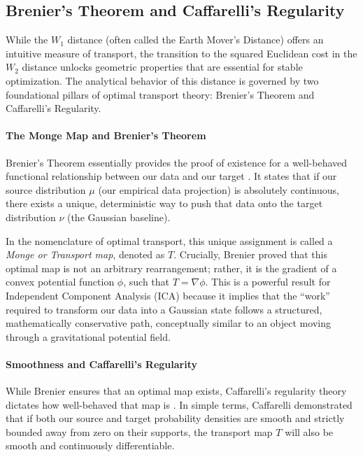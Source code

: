 \documentclass[12pt,a4paper,twoside,openany]{book}
\begin{document}
\subsection{Brenier's Theorem and Caffarelli's Regularity}
\label{sec:brenier_caffarelli}
While the $W_1$ distance (often called the Earth Mover's Distance) offers an intuitive measure of transport, the transition to the squared Euclidean cost in 
the $W_2$ distance unlocks geometric properties that are essential for stable optimization. The analytical behavior of this distance is governed by 
two foundational pillars of optimal transport theory: Brenier's Theorem and Caffarelli's Regularity.

\paragraph{The Monge Map and Brenier's Theorem}
Brenier's Theorem essentially provides the proof of existence for a well-behaved functional relationship between our data and our target \cite{brenier1991}. 
It states that if our source distribution $\mu$ (our empirical data projection) is absolutely continuous, there exists a unique, deterministic way to push that data onto 
the target distribution $\nu$ (the Gaussian baseline). 

In the nomenclature of optimal transport, this unique assignment is called a \textit{Monge or Transport map}, denoted as $T$. Crucially, Brenier proved that this optimal map is not 
an arbitrary rearrangement; rather, it is the gradient of a convex potential function $\phi$, such that $T = \nabla \phi$. This is a powerful result for 
Independent Component Analysis (ICA) because it implies that the ``work'' required to transform our data into a Gaussian state follows a structured, mathematically conservative path, 
conceptually similar to an object moving through a gravitational potential field.

\paragraph{Smoothness and Caffarelli's Regularity}
While Brenier ensures that an optimal map exists, Caffarelli's regularity theory dictates how well-behaved that map is \cite{caffarelli1992}. In simple terms, 
Caffarelli demonstrated that if both our source and target probability densities are smooth and strictly bounded away from zero on their supports, 
the transport map $T$ will also be smooth and continuously differentiable. 
\end{document}
